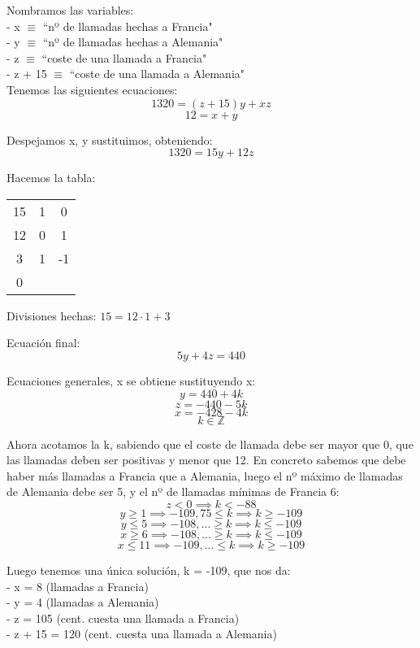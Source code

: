 \documentclass[11pt, a4paper, titlepage]{article}
\providecommand{\ent}{\mathbb{Z}}
\begin{document}
Nombramos las variables: \\
- x $\equiv$ “nº de llamadas hechas a Francia" \\
- y $\equiv$ “nº de llamadas hechas a Alemania" \\
- z $\equiv$ “coste de una llamada a Francia" \\
- z + 15 $\equiv$ “coste de una llamada a Alemania" \\

Tenemos las siguientes ecuaciones:
$$ 1320 = (z + 15)y + xz $$
$$ 12 = x + y $$

Despejamos x, y sustituimos, obteniendo:
$$ 1320 = 15y + 12z $$

Hacemos la tabla:

\begin{center}
\begin{tabular}{c|cc}
15 & 1 & 0 \\
12 & 0 & 1 \\
\hline
3 & 1 & -1 \\
\hline
0
\end{tabular}
\end{center}

Divisiones hechas: $ 15 = 12 \cdot 1 + 3 $

Ecuación final:
$$ 5y + 4z = 440 $$

Ecuaciones generales, x se obtiene sustituyendo x:
$$ y = 440 + 4k $$
$$ z = -440 - 5k $$
$$ x = -428 - 4k $$
$$ k \in \ent $$

Ahora acotamos la k, sabiendo que el coste de llamada debe ser mayor que 0, que las llamadas deben ser positivas y menor que 12. En concreto sabemos que debe haber más llamadas a Francia que a Alemania, luego el nº máximo de llamadas de Alemania debe ser 5, y el nº de llamadas mínimas de Francia 6:
$$ z < 0 \implies k < -88 $$
$$ y \geq 1 \implies -109,75 \leq k \implies k \geq -109 $$
$$ y \leq 5 \implies -108,... \geq k \implies k \leq -109 $$
$$ x \geq 6 \implies -108,... \geq k \implies k \leq -109 $$
$$ x \leq 11 \implies -109,... \leq k \implies k \geq -109 $$

Luego tenemos una única solución, k = -109, que nos da: \\
- x = 8 (llamadas a Francia) \\
- y = 4 (llamadas a Alemania) \\
- z = 105 (cent. cuesta una llamada a Francia) \\
- z + 15 = 120 (cent. cuesta una llamada a Alemania) \\
\end{document}
